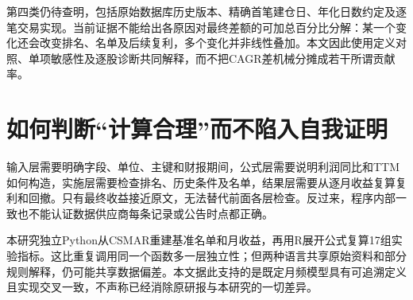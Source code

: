 第四类仍待查明，包括原始数据库历史版本、精确首笔建仓日、年化日数约定及逐笔交易实现。当前证据不能给出各原因对最终差额的可加总百分比分解：某一个变化还会改变排名、名单及后续复利，多个变化并非线性叠加。本文因此使用定义对照、单项敏感性及逐股诊断共同解释，而不把CAGR差机械分摊成若干所谓贡献率。

\section{如何判断“计算合理”而不陷入自我证明}
输入层需要明确字段、单位、主键和财报期间，公式层需要说明利润同比和TTM如何构造，实施层需要检查排名、历史条件及名单，结果层需要从逐月收益复算复利和回撤。只有最终收益接近原文，无法替代前面各层检查。反过来，程序内部一致也不能认证数据供应商每条记录或公告时点都正确。

本研究独立Python从CSMAR重建基准名单和月收益，再用R展开公式复算17组实验指标。这比重复调用同一个函数多一层独立性；但两种语言共享原始资料和部分规则解释，仍可能共享数据偏差。本文据此支持的是既定月频模型具有可追溯定义且实现交叉一致，不声称已经消除原研报与本研究的一切差异。

